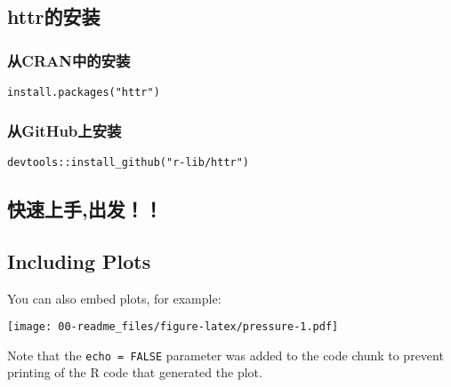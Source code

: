 \documentclass[]{article}
\begin{document}
\subsection{httr的安装}\label{httr}

\subsubsection{从CRAN中的安装}\label{cran}

\texttt{install.packages("httr")}

\subsubsection{从GitHub上安装}\label{github}

\texttt{devtools::install\_github("r-lib/httr")}

\subsection{快速上手,出发！！}

\subsection{Including Plots}\label{including-plots}

You can also embed plots, for example:

\texttt{[image: 00-readme\_files/figure-latex/pressure-1.pdf]}

Note that the \texttt{echo\ =\ FALSE} parameter was added to the code
chunk to prevent printing of the R code that generated the plot.
\end{document}
